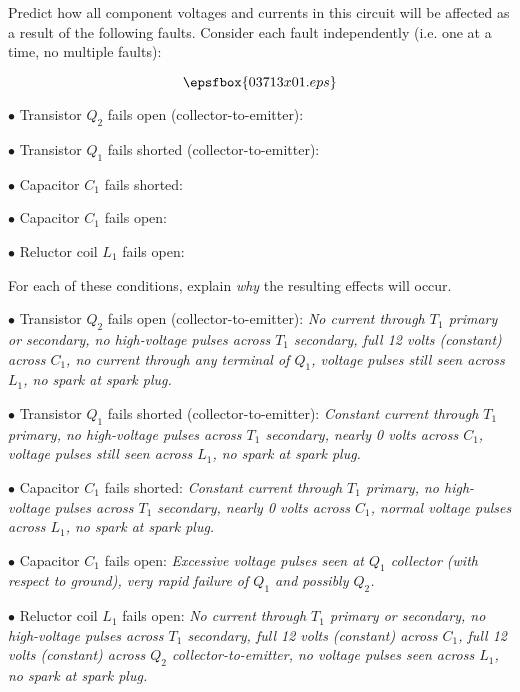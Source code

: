 

Predict how all component voltages and currents in this circuit will be affected as a result of the following faults.  Consider each fault independently (i.e. one at a time, no multiple faults):

$$\epsfbox{03713x01.eps}$$

\medskip
\item{$\bullet$} Transistor $Q_2$ fails open (collector-to-emitter):
\vskip 5pt
\item{$\bullet$} Transistor $Q_1$ fails shorted (collector-to-emitter):
\vskip 5pt
\item{$\bullet$} Capacitor $C_1$ fails shorted:
\vskip 5pt
\item{$\bullet$} Capacitor $C_1$ fails open:
\vskip 5pt
\item{$\bullet$} Reluctor coil $L_1$ fails open:
\medskip

For each of these conditions, explain {\it why} the resulting effects will occur.







\medskip
\item{$\bullet$} Transistor $Q_2$ fails open (collector-to-emitter): {\it No current through $T_1$ primary or secondary, no high-voltage pulses across $T_1$ secondary, full 12 volts (constant) across $C_1$, no current through any terminal of $Q_1$, voltage pulses still seen across $L_1$, no spark at spark plug.}
\vskip 5pt
\item{$\bullet$} Transistor $Q_1$ fails shorted (collector-to-emitter): {\it Constant current through $T_1$ primary, no high-voltage pulses across $T_1$ secondary, nearly 0 volts across $C_1$, voltage pulses still seen across $L_1$, no spark at spark plug.}
\vskip 5pt
\item{$\bullet$} Capacitor $C_1$ fails shorted: {\it Constant current through $T_1$ primary, no high-voltage pulses across $T_1$ secondary, nearly 0 volts across $C_1$, normal voltage pulses across $L_1$, no spark at spark plug.}
\vskip 5pt
\item{$\bullet$} Capacitor $C_1$ fails open: {\it Excessive voltage pulses seen at $Q_1$ collector (with respect to ground), very rapid failure of $Q_1$ and possibly $Q_2$.}
\vskip 5pt
\item{$\bullet$} Reluctor coil $L_1$ fails open: {\it No current through $T_1$ primary or secondary, no high-voltage pulses across $T_1$ secondary, full 12 volts (constant) across $C_1$, full 12 volts (constant) across $Q_2$ collector-to-emitter, no voltage pulses seen across $L_1$, no spark at spark plug.}
\medskip

